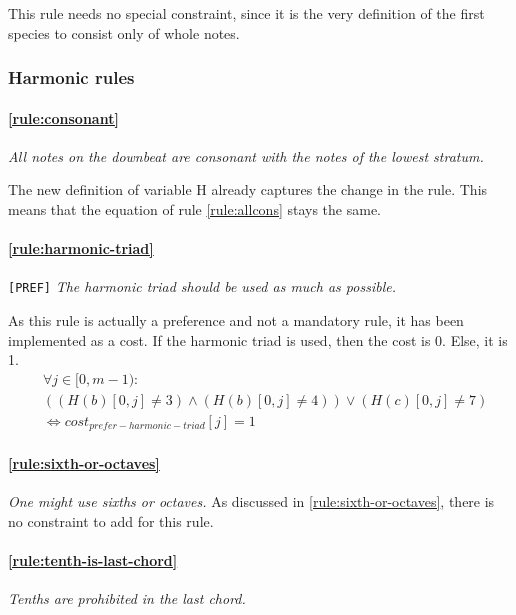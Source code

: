     This rule needs no special constraint, since it is the very definition of the first species  to consist only of whole notes.

\subsubsection{Harmonic rules}
\paragraph{\hspace{.6cm}\ref{rule:consonant}} \greendots \textit{All notes on the downbeat are consonant with the notes of the lowest stratum.}
    
    The new definition of variable H already captures the change in the rule. This means that the equation of rule \ref{rule:allcons} stays the same.
    \paragraph{\hspace{.6cm}\ref{rule:harmonic-triad}} \texttt{[PREF]} \textit{The harmonic triad should be used as much as possible.}
    
    As this rule is actually a preference and not a mandatory rule, it has been implemented as a cost. If the harmonic triad is used, then the cost is 0. Else, it is 1.
    \begin{equation}
    \begin{aligned}
    &\forall j \in [0, m-1) \colon \\
    &((H(b)[0, j] \neq 3) \land (H(b)[0, j] \neq 4)) \lor (H(c)[0, j]  \neq 7) \\
    &\iff cost_{prefer-harmonic-triad}[j] = 1
    \end{aligned}
    \end{equation}

    \paragraph{\hspace{.6cm}\ref{rule:sixth-or-octaves}}  \textit{One might use sixths or octaves.}
    As discussed in \ref{rule:sixth-or-octaves}, there is no constraint to add for this rule.
    
    \paragraph{\hspace{.6cm}\ref{rule:tenth-is-last-chord}}  \textit{Tenths are prohibited in the last chord.}

